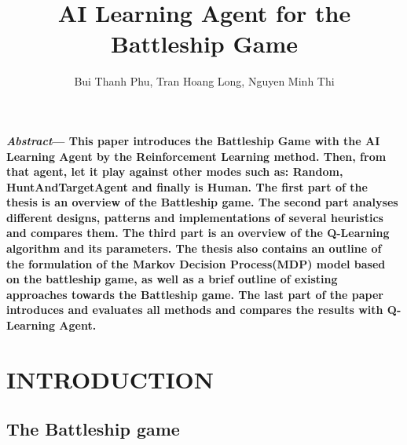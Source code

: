 \documentclass{article}
\title{\textbf{AI Learning Agent for the Battleship Game}}
\author{Bui Thanh Phu, Tran Hoang Long, Nguyen Minh Thi}
\date{}
\begin{document}
\maketitle

\begin{multicols}{2}
\textbf{\textit{Abstract}— This paper introduces the Battleship Game with the AI Learning Agent by the Reinforcement Learning method. Then, from that agent, let it play against other modes such as: Random, HuntAndTargetAgent and finally is Human. The first part of the thesis is an overview of the Battleship game. The second part analyses different designs, patterns and implementations of several heuristics and compares them. The third part is an overview of the Q-Learning algorithm and its parameters. The thesis also contains an outline of the formulation of the Markov Decision Process(MDP) model based on the battleship game, as well as a brief outline of existing approaches towards the Battleship game. The last part of the paper introduces and evaluates all methods and compares the results with Q-Learning Agent.}

\renewcommand*\thesection{\Alph{section}.}
\renewcommand*{\thesubsection}{\Roman{subsection}.}
\renewcommand*{\thesubsubsection}{\arabic{subsubsection}.}

\section{INTRODUCTION}
\subsection{The Battleship game}

\end{multicols}
\end{document}
